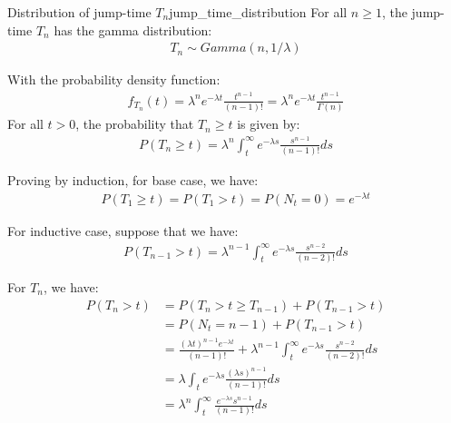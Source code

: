 \begin{proposition}{Distribution of jump-time $T_n$}{jump_time_distribution}
    For all $n\ge1$, the jump-time $T_n$ has the gamma distribution:
    \begin{align*}
        T_n \sim Gamma(n, 1/\lambda)
    \end{align*}

    \noindent With the probability density function:
    \begin{align*}
        f_{T_n}(t) = \lambda^n e^{-\lambda t}\frac{t^{n-1}}{(n-1)!} = \lambda^n e^{-\lambda t}\frac{t^{n-1}}{\Gamma(n)}
    \end{align*}
    \noindent For all $t>0$, the probability that $T_n\ge t$ is given by:
    \begin{align*}
        P(T_n \ge t) = \lambda^n \int_t^\infty e^{-\lambda s}\frac{s^{n-1}}{(n-1)!}ds
    \end{align*}
\end{proposition}
\begin{proof*}
    Proving by induction, for base case, we have:
    \begin{align*}
        P(T_1 \ge t) = P(T_1 > t) = P(N_t = 0) = e^{-\lambda t}
    \end{align*}

    \noindent For inductive case, suppose that we have:
    \begin{align*}
        P(T_{n-1} > t) = \lambda^{n-1}\int_{t}^{\infty} e^{-\lambda s}\frac{s^{n-2}}{(n-2)!}ds
    \end{align*}

    \noindent For $T_n$, we have:
    \begin{align*}
        P(T_n > t) &= P(T_n > t \ge T_{n-1}) + P(T_{n-1}>t) \\
        &= P(N_t = n-1) + P(T_{n-1} > t) \\
        &= \frac{(\lambda t)^{n-1} e^{-\lambda t}}{(n-1)!} + \lambda^{n-1}\int_{t}^{\infty} e^{-\lambda s}\frac{s^{n-2}}{(n-2)!}ds \\
        &= \lambda \int_{t}e^{-\lambda s}\frac{(\lambda s)^{n-1}}{(n-1)!}ds \\
        &= \lambda ^n\int_t^\infty \frac{e^{-\lambda s}s^{n-1}}{(n-1)!}ds
    \end{align*}
\end{proof*}

